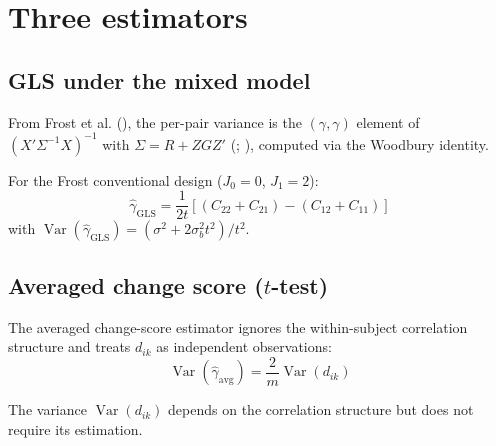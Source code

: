 \documentclass[
  11pt,
]{article}
\begin{document}
\section{Three estimators}\label{three-estimators}

\subsection{GLS under the mixed model}\label{gls-under-the-mixed-model}

From Frost et al. (), the per-pair
variance is the \((\gamma, \gamma)\) element of
\((X'\Sigma^{-1}X)^{-1}\) with \(\Sigma = R + ZGZ'\)
(;
), computed via
the Woodbury identity.

For the Frost conventional design (\(J_0 = 0\), \(J_1 = 2\)):
\begin{equation}
  \hat\gamma_{\text{GLS}} = \frac{1}{2t}
    [(C_{22} + C_{21}) - (C_{12} + C_{11})]
\end{equation} with \(\mathop{\mathrm{Var}}(\hat\gamma_{\text{GLS}}) =
(\sigma^2 + 2\sigma_b^2 t^2)/t^2\).

\subsection{\texorpdfstring{Averaged change score
(\(t\)-test)}{Averaged change score (t-test)}}\label{averaged-change-score-t-test}

The averaged change-score estimator ignores the within-subject
correlation structure and treats \(d_{ik}\) as independent observations:
\begin{equation}
  \mathop{\mathrm{Var}}(\hat\gamma_{\text{avg}})
  = \frac{2}{m}\mathop{\mathrm{Var}}(d_{ik})
\end{equation}

The variance \(\mathop{\mathrm{Var}}(d_{ik})\) depends on the
correlation structure but does not require its estimation.
\end{document}

